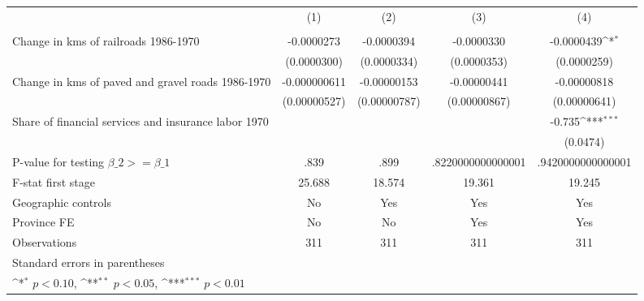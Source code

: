 {
\def\sym#1{\ifmmode^{#1}\else\(^{#1}\)\fi}
\begin{tabular}{l*{4}{c}}
\hline\hline
                &\multicolumn{1}{c}{(1)}&\multicolumn{1}{c}{(2)}&\multicolumn{1}{c}{(3)}&\multicolumn{1}{c}{(4)}\\
                &\multicolumn{1}{c}{}&\multicolumn{1}{c}{}&\multicolumn{1}{c}{}&\multicolumn{1}{c}{}\\
\hline
Change in kms of railroads 1986-1970&-0.0000273         &-0.0000394         &-0.0000330         &-0.0000439\sym{*}  \\
                &(0.0000300)         &(0.0000334)         &(0.0000353)         &(0.0000259)         \\
[1em]
Change in kms of paved and gravel roads 1986-1970&-0.000000611         &-0.00000153         &-0.00000441         &-0.00000818         \\
                &(0.00000527)         &(0.00000787)         &(0.00000867)         &(0.00000641)         \\
[1em]
Share of financial services and insurance labor 1970&                  &                  &                  &   -0.735\sym{***}\\
                &                  &                  &                  & (0.0474)         \\
\hline
P-value for testing $\beta\_{2} >= \beta\_{1}$&     .839         &     .899         &.8220000000000001         &.9420000000000001         \\
F-stat first stage&   25.688         &   18.574         &   19.361         &   19.245         \\
Geographic controls&       No         &      Yes         &      Yes         &      Yes         \\
Province FE     &       No         &       No         &      Yes         &      Yes         \\
Observations    &      311         &      311         &      311         &      311         \\
\hline\hline
\multicolumn{5}{l}{\footnotesize Standard errors in parentheses}\\
\multicolumn{5}{l}{\footnotesize \sym{*} \(p<0.10\), \sym{**} \(p<0.05\), \sym{***} \(p<0.01\)}\\
\end{tabular}
}
